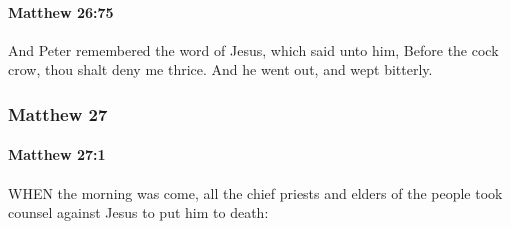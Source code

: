 		\paragraph{Matthew 26:75} %
			\label{MATTHEW-26-75}

			And Peter remembered the word of Jesus, which said unto him, Before the cock crow, thou shalt deny me thrice. And he went out, and wept bitterly.

			\begin{framed}
			\scriptsize
				\begin{compactdesc}
					\item[SBLG] 
				\end{compactdesc}
			\end{framed}

	\subsubsection{Matthew 27} %
		\label{MATTHEW-27}
		
		\paragraph{Matthew 27:1} %
			\label{MATTHEW-27-1}

			WHEN the morning was come, all the chief priests and elders of the people took counsel against Jesus to put him to death:

